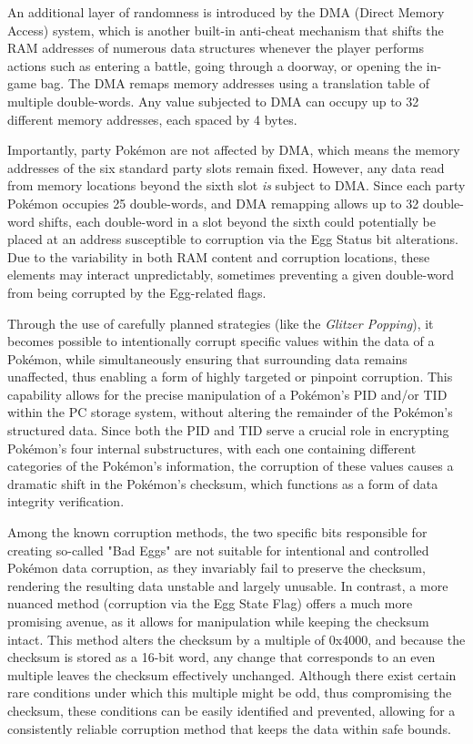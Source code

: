 \documentclass[a4paper]{usiinfbachelorproject}
\begin{document}
\newpage

An additional layer of randomness is introduced by the DMA (Direct Memory Access) system, which is another built-in anti-cheat mechanism that shifts the RAM addresses of numerous data structures whenever the player performs actions such as entering a battle, going through a doorway, or opening the in-game bag. The DMA remaps memory addresses using a translation table of multiple double-words. Any value subjected to DMA can occupy up to 32 different memory addresses, each spaced by 4 bytes.

Importantly, party Pokémon are not affected by DMA, which means the memory addresses of the six standard party slots remain fixed. However, any data read from memory locations beyond the sixth slot \textit{is} subject to DMA. Since each party Pokémon occupies 25 double-words, and DMA remapping allows up to 32 double-word shifts, each double-word in a slot beyond the sixth could potentially be placed at an address susceptible to corruption via the Egg Status bit alterations. Due to the variability in both RAM content and corruption locations, these elements may interact unpredictably, sometimes preventing a given double-word from being corrupted by the Egg-related flags.

Through the use of carefully planned strategies (like the \textit{Glitzer Popping}), it becomes possible to intentionally corrupt specific values within the data of a Pokémon, while simultaneously ensuring that surrounding data remains unaffected, thus enabling a form of highly targeted or pinpoint corruption. This capability allows for the precise manipulation of a Pokémon's PID and/or TID within the PC storage system, without altering the remainder of the Pokémon’s structured data. Since both the PID and TID serve a crucial role in encrypting Pokémon’s four internal substructures, with each one containing different categories of the Pokémon’s information, the corruption of these values causes a dramatic shift in the Pokémon’s checksum, which functions as a form of data integrity verification.

Among the known corruption methods, the two specific bits responsible for creating so-called "Bad Eggs" are not suitable for intentional and controlled Pokémon data corruption, as they invariably fail to preserve the checksum, rendering the resulting data unstable and largely unusable. In contrast, a more nuanced method (corruption via the Egg State Flag) offers a much more promising avenue, as it allows for manipulation while keeping the checksum intact. This method alters the checksum by a multiple of 0x4000, and because the checksum is stored as a 16-bit word, any change that corresponds to an even multiple leaves the checksum effectively unchanged. Although there exist certain rare conditions under which this multiple might be odd, thus compromising the checksum, these conditions can be easily identified and prevented, allowing for a consistently reliable corruption method that keeps the data within safe bounds.
\end{document}
